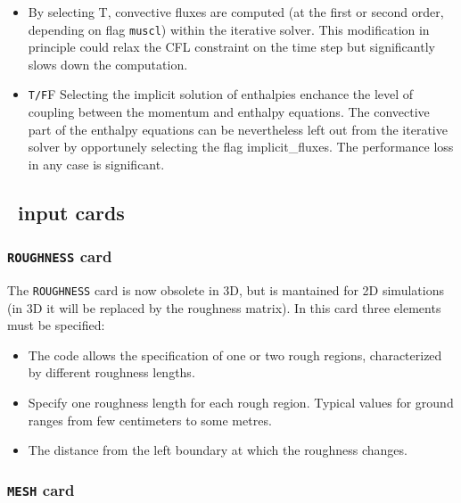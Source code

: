\begin{itemize}
\item
{}
{By selecting T, convective fluxes are computed (at the first or second order, 
depending on flag {\tt muscl}) within the iterative solver. This modification
in principle could relax the CFL constraint on the time step but significantly
slows down the computation.}

\item
{}
{{\tt T/F}}{F}
{Selecting the implicit solution of enthalpies enchance the level of coupling
between the momentum and enthalpy equations. The convective part of the 
enthalpy equations can be nevertheless left out from the iterative solver
by opportunely selecting the flag implicit\_fluxes. The performance loss
in any case is significant.}
\end{itemize}

\subsection{\PDAC\ input cards}
\label{section:cards}
\subsubsection{{\tt ROUGHNESS} card}

The {\tt ROUGHNESS} card is now obsolete in 3D, but is mantained for 2D 
simulations (in 3D it will be replaced by the roughness matrix). In this
card three elements must be specified:
\begin{itemize}
\item
{}
{The code allows the specification of one or two rough regions, characterized
by different roughness lengths.}

\item
{}
{Specify one roughness length for each rough region. Typical values for ground
ranges from few centimeters to some metres.}

\item
{}
{The distance from the left boundary at which the roughness changes.}

\end{itemize}

\subsubsection{{\tt MESH} card}


